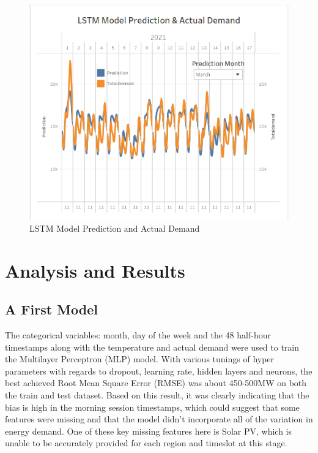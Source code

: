 \documentclass[mstat,12pt]{unswthesis}
\begin{document}
\begin{figure}[H]
\includegraphics{snapshots1/Slide 6 snapshot 2.png}
\caption{LSTM Model Prediction and Actual Demand}\label{4.9}
\end{figure}

\hypertarget{analysis-and-results}{%
\chapter{Analysis and Results}\label{analysis-and-results}}

\hypertarget{a-first-model}{%
\section{A First Model}\label{a-first-model}}

The categorical variables: month, day of the week and the 48 half-hour
timestamps along with the temperature and actual demand were used to
train the Multilayer Perceptron (MLP) model. With various tunings of
hyper parameters with regards to dropout, learning rate, hidden layers
and neurons, the best achieved Root Mean Square Error (RMSE) was about
450-500MW on both the train and test dataset. Based on this result, it
was clearly indicating that the bias is high in the morning session
timestamps, which could suggest that some features were missing and that
the model didn't incorporate all of the variation in energy demand. One
of these key missing features here is Solar PV, which is unable to be
accurately provided for each region and timeslot at this stage.
\end{document}
